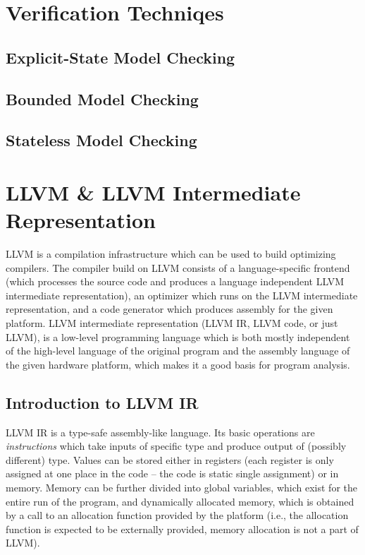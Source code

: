 \section{Verification Techniqes}

\subsection{Explicit-State Model Checking}

\subsection{Bounded Model Checking}

\subsection{Stateless Model Checking}

\section{LLVM \& LLVM Intermediate Representation}

LLVM is a compilation infrastructure which can be used to build optimizing compilers.
The compiler build on LLVM consists of a language-specific frontend (which processes the source code and produces a language independent LLVM intermediate representation), an optimizer which runs on the LLVM intermediate representation, and a code generator which produces assembly for the given platform.
LLVM intermediate representation (LLVM IR, LLVM code, or just LLVM), is a low-level programming language which is both mostly independent of the high-level language of the original program and the assembly language of the given hardware platform, which makes it a good basis for program analysis.

\subsection{Introduction to LLVM IR}

LLVM IR is a type-safe assembly-like language.
Its basic operations are \emph{instructions} which take inputs of specific type and produce output of (possibly different) type.
Values can be stored either in registers (each register is only assigned at one place in the code -- the code is static single assignment) or in memory.
Memory can be further divided into global variables, which exist for the entire run of the program, and dynamically allocated memory, which is obtained by a call to an allocation function provided by the platform (i.e., the allocation function is expected to be externally provided, memory allocation is not a part of LLVM).

